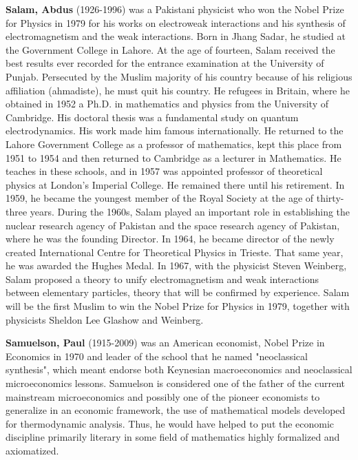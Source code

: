 \textbf{Salam, Abdus} (1926-1996) was a Pakistani physicist who won the Nobel Prize for Physics in 1979 for his works on electroweak interactions and his synthesis of electromagnetism and the weak interactions. Born in Jhang Sadar, he studied at the Government College in Lahore. At the age of fourteen, Salam received the best results ever recorded for the entrance examination at the University of Punjab. Persecuted by the Muslim majority of his country because of his religious affiliation (ahmadiste), he must quit his country. He refugees in Britain, where he obtained in 1952 a Ph.D. in mathematics and physics from the University of Cambridge. His doctoral thesis was a fundamental study on quantum electrodynamics. His work made him famous internationally. He returned to the Lahore Government College as a professor of mathematics, kept this place from 1951 to 1954 and then returned to Cambridge as a lecturer in Mathematics. He teaches in these schools, and in 1957 was appointed professor of theoretical physics at London's Imperial College. He remained there until his retirement. In 1959, he became the youngest member of the Royal Society at the age of thirty-three years. During the 1960s, Salam played an important role in establishing the nuclear research agency of Pakistan and the space research agency of Pakistan, where he was the founding Director. In 1964, he became director of the newly created International Centre for Theoretical Physics in Trieste. That same year, he was awarded the Hughes Medal. In 1967, with the physicist Steven Weinberg, Salam proposed a theory to unify electromagnetism and weak interactions between elementary particles, theory that will be confirmed by experience. Salam will be the first Muslim to win the Nobel Prize for Physics in 1979, together with physicists Sheldon Lee Glashow and Weinberg.

\textbf{Samuelson, Paul} (1915-2009) was an American economist, Nobel Prize in Economics in 1970 and leader of the school that he named "neoclassical synthesis", which meant endorse both Keynesian macroeconomics and neoclassical microeconomics lessons. Samuelson is considered one of the father of the current mainstream microeconomics and possibly one of the pioneer economists to generalize in an economic framework, the use of mathematical models developed for thermodynamic analysis. Thus, he would have helped to put the economic discipline primarily literary in some field of mathematics highly formalized and axiomatized.

